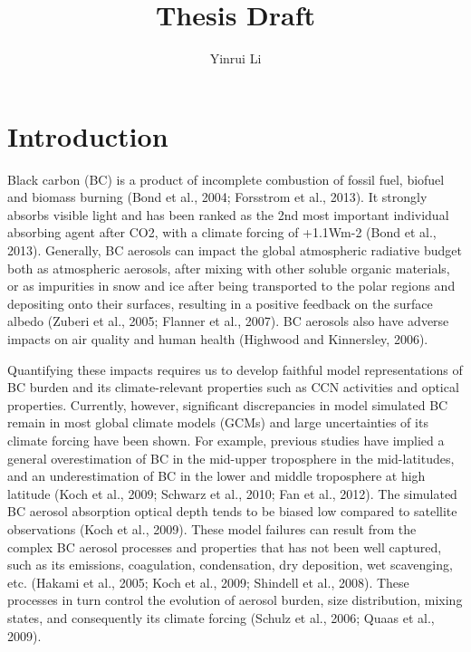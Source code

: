 \documentclass[12pt]{article}
\title{\textbf{Thesis Draft}}
\author{Yinrui Li}
\date{}
\begin{document}
	\maketitle
	
	
	
	\section{Introduction} 
	Black carbon (BC) is a product of incomplete combustion of fossil fuel, biofuel and biomass burning (Bond et al., 2004; Forsstrom et al., 2013). It strongly absorbs visible light and has been ranked as the 2nd most important individual absorbing agent after CO2, with a climate forcing of +1.1Wm-2 (Bond et al., 2013). Generally, BC aerosols can impact the global atmospheric radiative budget both as atmospheric aerosols, after mixing with other soluble organic materials, or as impurities in snow and ice after being transported to the polar regions and depositing onto their surfaces, resulting in a positive feedback on the surface albedo (Zuberi et al., 2005; Flanner et al., 2007). BC aerosols also have adverse impacts on air quality and human health (Highwood and Kinnersley, 2006).

	Quantifying these impacts requires us to develop faithful model representations of BC burden and its climate-relevant properties such as CCN activities and optical properties. Currently, however, significant discrepancies in model simulated BC remain in most global climate models (GCMs) and large uncertainties of its climate forcing have been shown. For example, previous studies have implied a general overestimation of BC in the mid-upper troposphere in the mid-latitudes, and an underestimation of BC in the lower and middle troposphere at high latitude (Koch et al., 2009; Schwarz et al., 2010; Fan et al., 2012). The simulated BC aerosol absorption optical depth tends to be biased low compared to satellite observations (Koch et al., 2009). These model failures can result from the complex BC aerosol processes and properties that has not been well captured, such as its emissions, coagulation, condensation, dry deposition, wet scavenging, etc. (Hakami et al., 2005; Koch et al., 2009; Shindell et al., 2008). These processes in turn control the evolution of aerosol burden, size distribution, mixing states, and consequently its climate forcing (Schulz et al., 2006; Quaas et al., 2009). 
\end{document}
